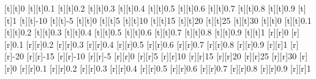 \begin{psfrags}
%
[t][t]{0}%
[t][t]{0.1}%
[t][t]{0.2}%
[t][t]{0.3}%
[t][t]{0.4}%
[t][t]{0.5}%
[t][t]{0.6}%
[t][t]{0.7}%
[t][t]{0.8}%
[t][t]{0.9}%
[t][t]{1}%
[t][t]{-10}%
[t][t]{-5}%
[t][t]{0}%
[t][t]{5}%
[t][t]{10}%
[t][t]{15}%
[t][t]{20}%
[t][t]{25}%
[t][t]{30}%
[t][t]{0}%
[t][t]{0.1}%
[t][t]{0.2}%
[t][t]{0.3}%
[t][t]{0.4}%
[t][t]{0.5}%
[t][t]{0.6}%
[t][t]{0.7}%
[t][t]{0.8}%
[t][t]{0.9}%
[t][t]{1}%
%
[r][r]{0}%
[r][r]{0.1}%
[r][r]{0.2}%
[r][r]{0.3}%
[r][r]{0.4}%
[r][r]{0.5}%
[r][r]{0.6}%
[r][r]{0.7}%
[r][r]{0.8}%
[r][r]{0.9}%
[r][r]{1}%
[r][r]{-20}%
[r][r]{-15}%
[r][r]{-10}%
[r][r]{-5}%
[r][r]{0}%
[r][r]{5}%
[r][r]{10}%
[r][r]{15}%
[r][r]{20}%
[r][r]{25}%
[r][r]{30}%
[r][r]{0}%
[r][r]{0.1}%
[r][r]{0.2}%
[r][r]{0.3}%
[r][r]{0.4}%
[r][r]{0.5}%
[r][r]{0.6}%
[r][r]{0.7}%
[r][r]{0.8}%
[r][r]{0.9}%
[r][r]{1}%
%
%
\end{psfrags}%
%
